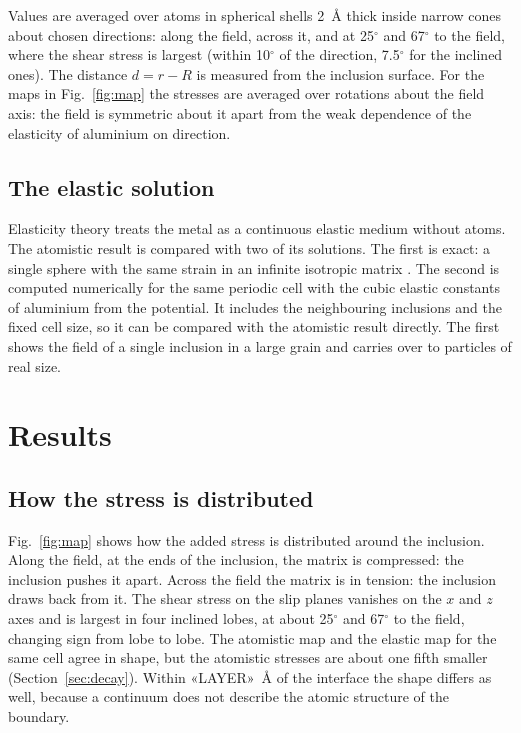 \documentclass[11pt,a4paper]{article}
\begin{document}
Values are averaged over atoms in spherical shells 2~\AA{} thick inside
narrow cones about chosen directions: along the field, across it, and at
25$^\circ$ and 67$^\circ$ to the field, where the shear stress is largest
(within 10$^\circ$ of the direction, 7.5$^\circ$ for the inclined ones). The
distance $d=r-R$ is measured from the inclusion surface. For the maps in
Fig.~\ref{fig:map} the stresses are averaged over rotations about the field
axis: the field is symmetric about it apart from the weak dependence of the
elasticity of aluminium on direction.

\subsection{The elastic solution}

Elasticity theory treats the metal as a continuous elastic medium without
atoms. The atomistic result is compared with two of its solutions. The first
is exact: a single sphere with the same strain in an infinite isotropic
matrix \cite{Eshelby1957,Mura1987,JuSun1999}. The second is computed
numerically for the same periodic cell \cite{MoulinecSuquet1998} with the
cubic elastic constants of aluminium from the potential. It includes the
neighbouring inclusions and the fixed cell size, so it can be compared with
the atomistic result directly. The first shows the field of a single
inclusion in a large grain and carries over to particles of real size.

\section{Results}

\subsection{How the stress is distributed}

Fig.~\ref{fig:map} shows how the added stress is distributed around the
inclusion. Along the field, at the ends of the inclusion, the matrix is
compressed: the inclusion pushes it apart. Across the field the matrix is in
tension: the inclusion draws back from it. The shear stress on the slip planes
vanishes on the $x$ and $z$ axes and is largest in four inclined lobes, at
about 25$^\circ$ and 67$^\circ$ to the field, changing sign from lobe to lobe.
The atomistic map and the elastic map for the same cell agree in shape, but
the atomistic stresses are about one fifth smaller
(Section~\ref{sec:decay}). Within «LAYER»~\AA{} of the interface the shape
differs as well, because a continuum does not describe the atomic structure
of the boundary.
\end{document}
